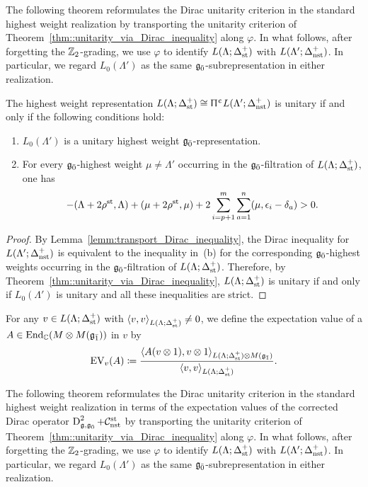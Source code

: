 The following theorem reformulates the Dirac unitarity criterion
in the standard highest weight realization by transporting the unitarity criterion of Theorem~\ref{thm::unitarity_via_Dirac_inequality} along $\varphi$. In what follows, after forgetting the ${\mathbb Z}_2$-grading, we use $\varphi$ to identify $L(\Lambda;\Delta_{{\text{st}}}^{+})$ with $L(\Lambda';\Delta_{{\text{nst}}}^{+})$. In particular, we regard $L_0(\Lambda')$ as the same ${\mathfrak{g}_{\bar{0}}}$-subrepresentation in either realization.

\begin{theorem}\label{thm::unitarity_standard_case}
The highest weight representation
$
L(\Lambda;\Delta_{{\text{st}}}^{+})
\cong
 \Uppi^{\upepsilon}L(\Lambda';\Delta_{{\text{nst}}}^{+})
$
is unitary if and only if the following conditions hold:
\begin{enumerate}
 \item[(a)]
 $L_0(\Lambda')$ is a unitary highest weight
 ${\mathfrak{g}_{\bar{0}}}$-representation.

 \item[(b)]
 For every ${\mathfrak{g}_{\bar{0}}}$-highest weight $\mu\neq\Lambda'$ occurring in the
 ${\mathfrak{g}_{\bar{0}}}$-filtration of
 $L(\Lambda;\Delta_{{\text{st}}}^{+})$, one has
 \[
 -(\Lambda+2\rho^{{\text{st}}},\Lambda)
 +(\mu+2\rho^{{\text{st}}},\mu)
 +2\sum_{i=p+1}^{m}\sum_{a=1}^{n}
 (\mu,\epsilon_i-\delta_a)
 >0.
 \]
\end{enumerate}
\end{theorem}


\begin{proof}
By Lemma~\ref{lemm:transport_Dirac_inequality}, the Dirac inequality for
$L(\Lambda';\Delta_{{\text{nst}}}^{+})$ is equivalent to the inequality in~(b) for the
corresponding ${\mathfrak{g}_{\bar{0}}}$-highest weights occurring in the
${\mathfrak{g}_{\bar{0}}}$-filtration of
$L(\Lambda;\Delta_{{\text{st}}}^{+})$.
Therefore, by Theorem~\ref{thm::unitarity_via_Dirac_inequality},
$L(\Lambda;\Delta_{{\text{st}}}^{+})$ is unitary if and only if
$L_0(\Lambda')$ is unitary and all these inequalities are strict.
\end{proof}

\iffalse
For any $v\in L(\Lambda;\Delta_{{\text{st}}}^{+})$ with $\langle v,v\rangle_{L(\Lambda;\Delta_{{\text{st}}}^{+})}\neq 0$, we define the expectation value of a $A \in \operatorname{End}_{{\mathbb C}}(M\otimes M({\mathfrak{g}_{\bar{1}}}))$ in $v$ by 
\begin{equation}
{\text{EV}}_{v}(A)
\coloneqq
\frac{
\langle
A(v\otimes 1),
v\otimes 1
\rangle_{L(\Lambda;\Delta_{{\text{st}}}^{+})\otimes M({\mathfrak{g}_{\bar{1}}})}
}{
\langle
v,v
\rangle_{L(\Lambda;\Delta_{{\text{st}}}^{+})}
}.
\end{equation}

The following theorem reformulates the Dirac unitarity criterion
in the standard highest weight realization in terms of
the expectation values of the corrected Dirac operator $\operatorname{D}^{2}_{{\mathfrak{g}},{\mathfrak{g}_{\bar{0}}}}+\mathcal{C}_{{\text{nst}}}^{{\text{st}}}$ by transporting the unitarity criterion of Theorem~\ref{thm::unitarity_via_Dirac_inequality} along $\varphi$. In what follows, after forgetting the ${\mathbb Z}_2$-grading, we use $\varphi$ to identify $L(\Lambda;\Delta_{{\text{st}}}^{+})$ with $L(\Lambda';\Delta_{{\text{nst}}}^{+})$. In particular, we regard $L_0(\Lambda')$ as the same ${\mathfrak{g}_{\bar{0}}}$-subrepresentation in either realization.

